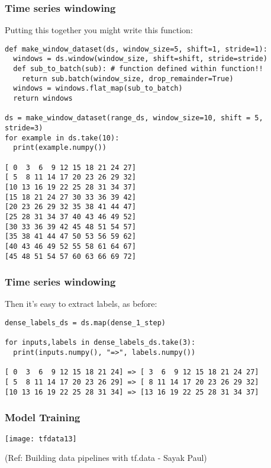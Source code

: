 \begin{frame}[fragile]\frametitle{Time series windowing}

Putting this together you might write this function:

\begin{lstlisting}
def make_window_dataset(ds, window_size=5, shift=1, stride=1):
  windows = ds.window(window_size, shift=shift, stride=stride)
  def sub_to_batch(sub): # function defined within function!!
    return sub.batch(window_size, drop_remainder=True)
  windows = windows.flat_map(sub_to_batch)
  return windows

ds = make_window_dataset(range_ds, window_size=10, shift = 5, stride=3)
for example in ds.take(10):
  print(example.numpy())
	
[ 0  3  6  9 12 15 18 21 24 27]
[ 5  8 11 14 17 20 23 26 29 32]
[10 13 16 19 22 25 28 31 34 37]
[15 18 21 24 27 30 33 36 39 42]
[20 23 26 29 32 35 38 41 44 47]
[25 28 31 34 37 40 43 46 49 52]
[30 33 36 39 42 45 48 51 54 57]
[35 38 41 44 47 50 53 56 59 62]
[40 43 46 49 52 55 58 61 64 67]
[45 48 51 54 57 60 63 66 69 72]
\end{lstlisting}
\end{frame}

\begin{frame}[fragile]\frametitle{Time series windowing}

Then it's easy to extract labels, as before:


\begin{lstlisting}
dense_labels_ds = ds.map(dense_1_step)

for inputs,labels in dense_labels_ds.take(3):
  print(inputs.numpy(), "=>", labels.numpy())
	
[ 0  3  6  9 12 15 18 21 24] => [ 3  6  9 12 15 18 21 24 27]
[ 5  8 11 14 17 20 23 26 29] => [ 8 11 14 17 20 23 26 29 32]
[10 13 16 19 22 25 28 31 34] => [13 16 19 22 25 28 31 34 37]
\end{lstlisting}
\end{frame}

\begin{frame}[fragile]\frametitle{Model Training}

\begin{center}
\texttt{[image: tfdata13]}

{\tiny (Ref: Building data pipelines with tf.data - Sayak Paul)}

\end{center}
\end{frame}


